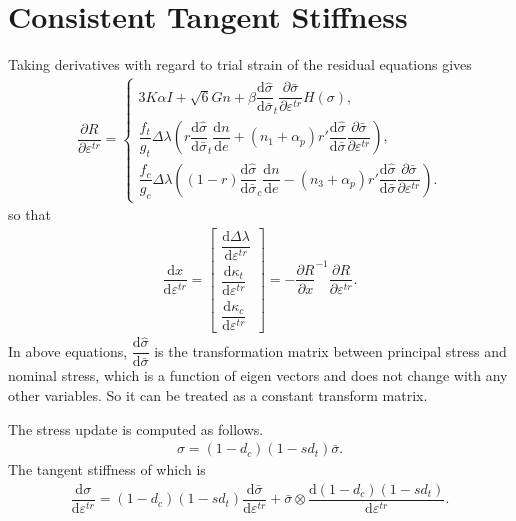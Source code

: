 \documentclass[11pt,fleqn]{article}
\newcommand*{\md}[1]{\mathrm{d}#1}
\newcommand*{\ddfrac}[2]{\dfrac{\md#1}{\md#2}}
\newcommand*{\pfrac}[2]{\dfrac{\partial#1}{\partial#2}}
\begin{document}
\section{Consistent Tangent Stiffness}
Taking derivatives with regard to trial strain of the residual equations gives
\begin{gather}
\pfrac{R}{\varepsilon^{tr}}=\left\{
\begin{array}{l}
3K\alpha{}I+\sqrt{6}Gn+\beta\ddfrac{\hat\sigma}{\bar\sigma}_t\pfrac{\bar\sigma}{\varepsilon^{tr}}H(\sigma),\\[4mm]
\dfrac{f_t}{g_t}\Delta\lambda\left(r\ddfrac{\hat\sigma}{\bar\sigma}_t\ddfrac{n}{e}+\left(n_1+\alpha_p\right)r'\ddfrac{\hat\sigma}{\bar\sigma}\pfrac{\bar\sigma}{\varepsilon^{tr}}\right),\\[4mm]
\dfrac{f_c}{g_c}\Delta\lambda\left(\left(1-r\right)\ddfrac{\hat\sigma}{\bar\sigma}_c\ddfrac{n}{e}-\left(n_3+\alpha_p\right)r'\ddfrac{\hat\sigma}{\bar\sigma}\pfrac{\bar\sigma}{\varepsilon^{tr}}\right).
\end{array}
\right.
\end{gather}
so that
\begin{gather}
\ddfrac{x}{\varepsilon^{tr}}=\begin{bmatrix}
\ddfrac{\Delta\lambda}{\varepsilon^{tr}}\\[3mm]
\ddfrac{\kappa_t}{\varepsilon^{tr}}\\[3mm]
\ddfrac{\kappa_c}{\varepsilon^{tr}}
\end{bmatrix}=-\pfrac{R}{x}^{-1}\pfrac{R}{\varepsilon^{tr}}.
\end{gather}
In above equations, $\ddfrac{\hat\sigma}{\bar\sigma}$ is the transformation matrix between principal stress and nominal stress, which is a function of eigen vectors and does not change with any other variables. So it can be treated as a constant transform matrix.

The stress update is computed as follows.
\begin{gather}
\sigma=(1-d_c)(1-sd_t)\bar{\sigma}.
\end{gather}
The tangent stiffness of which is
\begin{gather}
\ddfrac{\sigma}{\varepsilon^{tr}}=(1-d_c)(1-sd_t)\ddfrac{\bar{\sigma}}{\varepsilon^{tr}}+\bar{\sigma}\otimes\ddfrac{(1-d_c)(1-sd_t)}{\varepsilon^{tr}}.
\end{gather}
\end{document}
